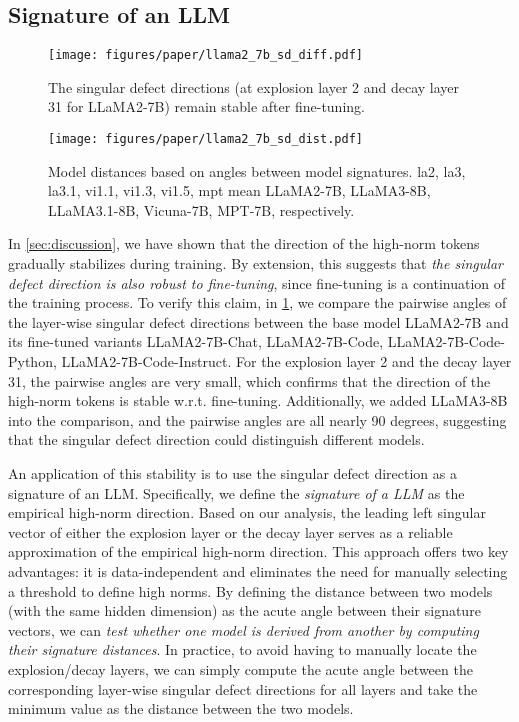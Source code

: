 \subsection{Signature of an LLM}\label{sec:signature}

\begin{figure}[t]
    \centering
    \texttt{[image: figures/paper/llama2\_7b\_sd\_diff.pdf]}
    \vspace{-0.5em}
    \caption{The singular defect directions (at explosion layer 2 and decay layer 31 for LLaMA2-7B) remain stable after fine-tuning.
    }\label{fig:stable_dir_finetune}
    \vspace{-0.5em}
\end{figure}


\begin{figure}[t]
    \centering
    \texttt{[image: figures/paper/llama2\_7b\_sd\_dist.pdf]}
    \vspace{-1em}
    \caption{Model distances based on angles between model signatures.
        la2, la3, la3.1, vi1.1, vi1.3, vi1.5, mpt mean LLaMA2-7B, LLaMA3-8B, LLaMA3.1-8B, Vicuna-7B, MPT-7B, respectively.
    }\label{fig:model_dist}
    \vspace{-1em}
\end{figure}
In \cref{sec:discussion}, we have shown that the direction of the high-norm tokens gradually stabilizes during training.
By extension, this suggests that \emph{the singular defect direction is also robust to fine-tuning}, since fine-tuning is a continuation of the training process.
To verify this claim, in \cref{fig:stable_dir_finetune}, we compare the pairwise angles of the layer-wise singular defect directions between the base model LLaMA2-7B and its fine-tuned variants LLaMA2-7B-Chat, LLaMA2-7B-Code, LLaMA2-7B-Code-Python, LLaMA2-7B-Code-Instruct.
For the explosion layer 2 and the decay layer 31, the pairwise angles are very small, which confirms that the direction of the high-norm tokens is stable w.r.t. fine-tuning.
Additionally, we added LLaMA3-8B into the comparison, and the pairwise angles are all nearly 90 degrees, suggesting that the singular defect direction could distinguish different models.

An application of this stability is to use the singular defect direction as a signature of an LLM\@.
Specifically, we define the \emph{signature of a LLM} as the empirical high-norm direction.
Based on our analysis, the leading left singular vector of either the explosion layer or the decay layer serves as a reliable approximation of the empirical high-norm direction. This approach offers two key advantages: it is data-independent and eliminates the need for manually selecting a threshold to define high norms.
By defining the distance between two models (with the same hidden dimension) as the acute angle between their signature vectors, we can \emph{test whether one model is derived from another by computing their signature distances}.
In practice, to avoid having to manually locate the explosion/decay layers, we can simply compute the acute angle between the corresponding layer-wise singular defect directions for all layers and take the minimum value as the distance between the two models.

